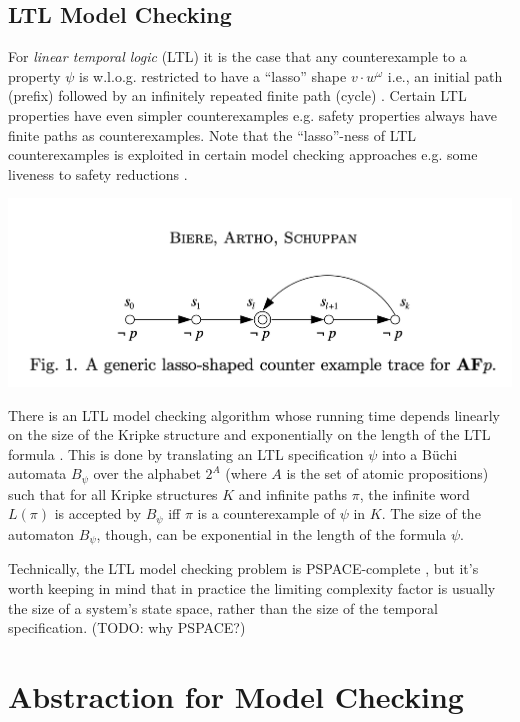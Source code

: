 \documentclass[10pt,a4paper]{article}
\begin{document}
\subsection*{LTL Model Checking}

For \textit{linear temporal logic} (LTL) it is the case that any counterexample to a property $\psi$ is w.l.o.g. restricted to have a ``lasso'' shape $v\cdot w^{\omega}$ i.e., an initial path (prefix) followed by an infinitely repeated finite path (cycle) \cite{1983wolpervardi}. Certain LTL properties have even simpler counterexamples e.g. safety properties always have finite paths as counterexamples. Note that the ``lasso''-ness of LTL counterexamples is exploited in certain model checking approaches e.g. some liveness to safety reductions \cite{BIERE2002160}.

\begin{center}
    \includegraphics[scale=0.3]{images/ltl-lasso.png}
\end{center}

There is an LTL model checking algorithm whose running time depends linearly on the size of the Kripke structure and exponentially on the length of the LTL formula \cite{1985pnuelilich}. This is done by translating an LTL specification $\psi$ into a B{\"u}chi automata $B_{\psi}$ over the alphabet $2^A$ (where $A$ is the set of atomic propositions) such that for all Kripke structures $K$ and infinite paths $\pi$, the infinite word $L(\pi)$ is accepted by $B_{\psi}$ iff $\pi$ is a counterexample of $\psi$ in $K$. The size of the automaton $B_{\psi}$, though, can be exponential in the length of the formula $\psi$. 

Technically, the LTL model checking problem is PSPACE-complete \cite{1985sistlaclarke}, but it's worth keeping in mind that in practice the limiting complexity factor is usually the size of a system's state space, rather than the size of the temporal specification. (TODO: why PSPACE?)

\section{Abstraction for Model Checking}
\end{document}
